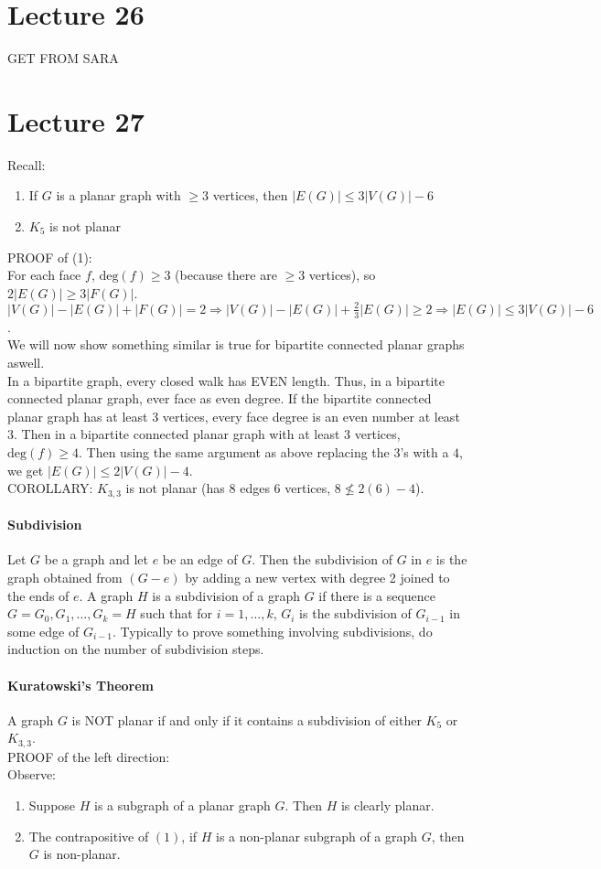 \documentclass[10pt,letter]{article}
\begin{document}
\section*{Lecture 26}
GET FROM SARA

\section*{Lecture 27}
Recall: \begin{enumerate}
    \item If $G$ is a planar graph with $\geq3$ vertices, then $|E(G)|\leq 3|V(G)|-6$ 
    \item $K_5$ is not planar 
\end{enumerate}
PROOF of (1): \\ 
For each face $f$, $\text{deg}(f)\geq3$ (because there are $\geq3$ vertices), so $2|E(G)|\geq 3|F(G)|$. $|V(G)|-|E(G)|+|F(G)|=2\Rightarrow |V(G)|-|E(G)|+\frac{2}{3}|E(G)|\geq2\Rightarrow |E(G)|\leq 3|V(G)|-6$.  \\ 
We will now show something similar is true for bipartite connected planar graphs aswell. \\ 
In a bipartite graph, every closed walk has EVEN length. Thus, in a bipartite connected planar graph, ever face as even degree. If the bipartite connected planar graph has at least 3 vertices, every face degree is an even number at least 3. Then in a bipartite connected planar graph with at least 3 vertices, $\text{deg}(f)\geq4$. Then using the same argument as above replacing the $3$'s with a $4$, we get $|E(G)|\leq 2|V(G)|-4$.\\ 
COROLLARY: $K_{3,3}$ is not planar (has 8 edges 6 vertices, $8\nleq 2(6)-4$).  
\paragraph{Subdivision}
Let $G$ be a graph and let $e$ be an edge of $G$. Then the subdivision of $G$ in $e$ is the graph obtained from $(G-e)$ by adding a new vertex with degree 2 joined to the ends of $e$. A graph $H$ is a subdivision of a graph $G$ if there is a sequence $G=G_0,G_1,\ldots,G_k=H$ such that for $i=1,\ldots,k$, $G_i$ is the subdivision of $G_{i-1}$ in some edge of $G_{i-1}$. Typically to prove something involving subdivisions, do induction on the number of subdivision steps. 

\paragraph{Kuratowski's Theorem} 
A graph $G$ is NOT planar if and only if it contains a subdivision of either $K_5$ or $K_{3,3}$. \\ 
PROOF of the left direction: \\ 
Observe: 
\begin{enumerate}
    \item Suppose $H$ is a subgraph of a planar graph $G$. Then $H$ is clearly planar. 
    \item The contrapositive of $(1)$, if $H$ is a non-planar subgraph of a graph $G$, then $G$ is non-planar.
\end{enumerate}
\end{document}
